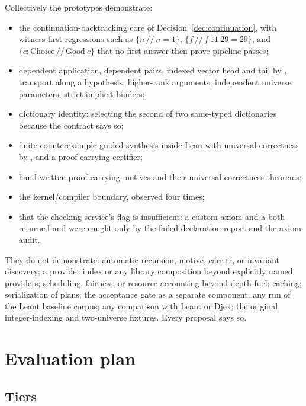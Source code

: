 Collectively the prototypes demonstrate:
\begin{itemize}
\item the continuation-backtracking core of Decision~\ref{dec:continuation}, with witness-first regressions such as $\{n \,//\, n = 1\}$, $\{f \,//\, f\ 11\ 29 = 29\}$, and $\{c : \mathrm{Choice} \,//\, \mathrm{Good}\ c\}$ that no first-answer-then-prove pipeline passes;
\item dependent application, dependent pairs, indexed vector head and tail by , transport along a hypothesis, higher-rank arguments, independent universe parameters, strict-implicit binders;
\item dictionary identity: selecting the second of two same-typed dictionaries because the contract says so;
\item finite counterexample-guided synthesis inside Lean with universal correctness by , and a proof-carrying certifier;
\item hand-written proof-carrying motives and their universal correctness theorems;
\item the kernel/compiler boundary, observed four times;
\item that the checking service's  flag is insufficient: a custom axiom and a  both returned  and were caught only by the failed-declaration report and the axiom audit.
\end{itemize}

They do not demonstrate: automatic recursion, motive, carrier, or invariant discovery; a provider index or any library composition beyond explicitly named providers; scheduling, fairness, or resource accounting beyond depth fuel; caching; serialization of plans; the acceptance gate as a separate component; any run of the Leant baseline corpus; any comparison with Leant or Djex; the original integer-indexing and two-universe fixtures. Every proposal says so.

\section{Evaluation plan}\label{sec:evaluation}

\subsection{Tiers}

